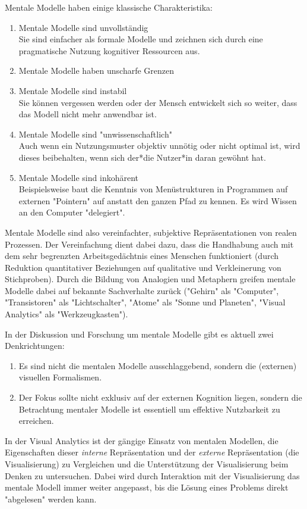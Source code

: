 			Mentale Modelle haben einige klassische Charakteristika:
			\begin{enumerate}
				\item Mentale Modelle sind unvollständig \\
					Sie sind einfacher als formale Modelle und zeichnen sich durch eine pragmatische Nutzung kognitiver Ressourcen aus.
				\item Mentale Modelle haben unscharfe Grenzen
				\item Mentale Modelle sind instabil \\
					Sie können vergessen werden oder der Mensch entwickelt sich so weiter, dass das Modell nicht mehr anwendbar ist.
				\item Mentale Modelle sind "unwissenschaftlich" \\
					Auch wenn ein Nutzungsmuster objektiv unnötig oder nicht optimal ist, wird dieses beibehalten, wenn sich der*die Nutzer*in daran gewöhnt hat.
				\item Mentale Modelle sind inkohärent \\
					Beispielsweise baut die Kenntnis von Menüstrukturen in Programmen auf externen "Pointern" auf anstatt den ganzen Pfad zu kennen. Es wird Wissen an den Computer "delegiert".
			\end{enumerate}
			Mentale Modelle sind also vereinfachter, subjektive Repräsentationen von realen Prozessen. Der Vereinfachung dient dabei dazu, dass die Handhabung auch mit dem sehr begrenzten Arbeitsgedächtnis eines Menschen funktioniert (\zB durch Reduktion quantitativer Beziehungen auf qualitative und Verkleinerung von Stichproben). Durch die Bildung von Analogien und Metaphern greifen mentale Modelle dabei auf bekannte Sachverhalte zurück (\zB "Gehirn" als "Computer", "Transistoren" als "Lichtschalter", "Atome" als "Sonne und Planeten", "Visual Analytics" als "Werkzeugkasten").

			In der Diskussion und Forschung um mentale Modelle gibt es aktuell zwei Denkrichtungen:
			\begin{enumerate}
				\item Es sind nicht die mentalen Modelle ausschlaggebend, sondern die (externen) visuellen Formalismen.
				\item Der Fokus sollte nicht exklusiv auf der externen Kognition liegen, sondern die Betrachtung mentaler Modelle ist essentiell um effektive Nutzbarkeit zu erreichen.
			\end{enumerate}
			In der Visual Analytics ist der gängige Einsatz von mentalen Modellen, die Eigenschaften dieser \emph{interne} Repräsentation und der \emph{externe} Repräsentation (die Visualisierung) zu Vergleichen und die Unterstützung der Visualisierung beim Denken zu untersuchen. Dabei wird durch Interaktion mit der Visualisierung das mentale Modell immer weiter angepasst, bis die Lösung eines Problems direkt "abgelesen" werden kann.


